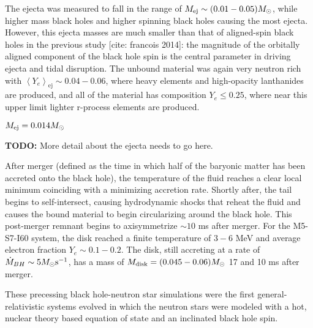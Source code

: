The ejecta was measured to fall in the range of $M_{\rm ej} \sim (0.01 - 0.05) M_\odot$, while higher mass black holes and higher spinning black holes causing the most ejecta.  However, this ejecta masses are much smaller than that of aligned-spin black holes in the previous study [cite: francois 2014]: the magnitude of the orbitally aligned component of the black hole spin is the central parameter in driving ejecta and tidal disruption.  The unbound material was again very neutron rich with $\left\langle Y_e \right\rangle_\textrm{ej} \sim 0.04 - 0.06$, where heavy elements and high-opacity lanthanides are produced, and all of the material has composition $Y_e \le 0.25$, where near this upper limit lighter r-process elements are produced.

$M_{\rm ej} = 0.014 M_\odot$

\textbf{TODO:} More detail about the ejecta needs to go here.

After merger (defined as the time in which half of the baryonic matter has been accreted onto the black hole), the temperature of the fluid reaches a clear local minimum coinciding with a minimizing accretion rate.  Shortly after, the tail begins to self-intersect, causing hydrodynamic shocks that reheat the fluid and causes the bound material to begin circularizing around the black hole.  
This post-merger remnant begins to axisymmetrize $\sim 10$ ms after merger.  
For the M5-S7-I60 system, the disk reached a finite temperature of $3 - 6$ MeV and average electron fraction $Y_e \sim 0.1 - 0.2$.  The disk, still accreting at a rate of $\dot{M}_{BH} \sim 5 M_\odot {\rm s}^{-1}$, has a mass of $M_{\rm disk} = (0.045 - 0.06) M_\odot$ 17 and 10 ms after merger.

These precessing black hole-neutron star simulations were the first general-relativistic systems evolved in which the neutron stars were modeled with a hot, nuclear theory based equation of state and an inclinated black hole spin.


